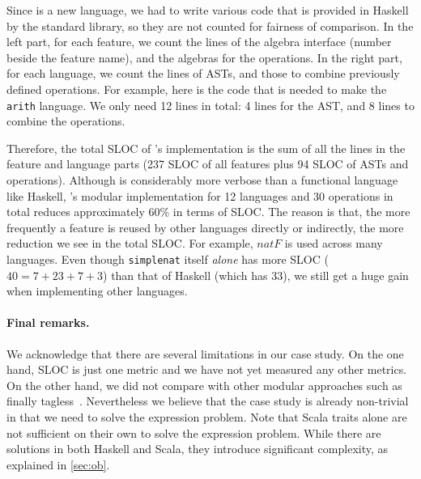 Since \sedel is a new language, we
had to write various code that is provided in Haskell by the standard library,
so they are not counted for fairness of comparison. In the left part, for each
feature, we count the lines of the algebra interface (number beside the feature
name), and the algebras for the operations. In the right part, for each
language, we count the lines of ASTs, and those to combine previously
defined operations. For example, here is the code that is needed to make the
\lstinline{arith} language.
We only need 12 lines in total: 4 lines for the AST, and 8 lines to combine the operations.

Therefore, the total SLOC of \sedel's implementation is the sum of all the
lines in the feature and language parts (237 SLOC of all features plus 94 SLOC
of ASTs and operations). Although \sedel is considerably more verbose than a
functional language like Haskell, \sedel's modular implementation for 12 languages and 30
operations in total reduces approximately 60\% in terms of SLOC. The reason is
that, the more frequently a feature is reused by other languages directly or
indirectly, the more reduction we see in the total SLOC. For example,
$\mathit{natF}$ is used across many languages. Even though \lstinline{simplenat}
itself \emph{alone} has more SLOC ($40 = 7+23+7+3$) than that of Haskell (which
has 33), we still get a huge gain when implementing other languages.

\paragraph{Final remarks.}

We acknowledge that there are several limitations in our case study. On the one
hand, SLOC is just one metric and we have not yet measured any other metrics. On
the other hand, we did not compare with other modular approaches such as finally
tagless~\citep{CARETTE_2009}. Nevertheless we believe that the case study is already non-trivial in
that we need to solve the expression problem. Note that Scala traits alone are
not sufficient on their own to solve the expression problem. While there are
solutions in both Haskell and Scala, they introduce significant complexity, as
explained in \cref{sec:ob}.


